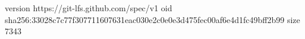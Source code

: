 version https://git-lfs.github.com/spec/v1
oid sha256:33028c7c77f307711607631eac030e2c0e0e3d475fec00af6e4d1fc49bff2b99
size 7343
